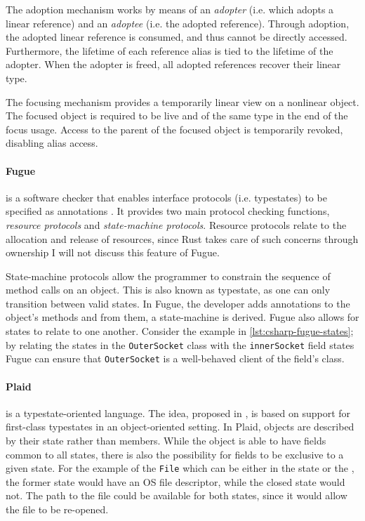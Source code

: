 The adoption mechanism works by means of an \emph{adopter} (i.e. which adopts a linear reference) and an \emph{adoptee} (i.e. the adopted reference).
Through adoption, the adopted linear reference is consumed, and thus cannot be directly accessed.
Furthermore, the lifetime of each reference alias is tied to the lifetime of the adopter.
When the adopter is freed, all adopted references recover their linear type.

The focusing mechanism provides a temporarily linear view on a nonlinear object.
The focused object is required to be live and of the same type in the end of the focus usage.
Access to the parent of the focused object is temporarily revoked, disabling alias access.

\paragraph{Fugue} is a software checker that enables interface protocols (i.e. typestates) to be specified as annotations \autocite{DeLine2004}.
It provides two main protocol checking functions, \emph{resource protocols} and \emph{state-machine protocols}.
Resource protocols relate to the allocation and release of resources,
since Rust takes care of such concerns through ownership I will not discuss this feature of Fugue.

State-machine protocols allow the programmer to constrain the sequence of method calls on an object.
This is also known as typestate, as one can only transition between valid states.
In Fugue, the developer adds annotations to the object's methods and from them, a state-machine is derived.
Fugue also allows for states to relate to one another.
Consider the example in \autoref{lst:csharp-fugue-states}; by relating the states in the \texttt{OuterSocket} class
with the \texttt{innerSocket} field states Fugue can ensure that \texttt{OuterSocket} is a well-behaved client of the field's class.



\paragraph{Plaid} is a typestate-oriented language.
The idea, proposed in \autocite{Aldrich2009}, is based on support for first-class typestates in an object-oriented setting.
In Plaid, objects are described by their state rather than members.
While the object is able to have fields common to all states, there is also the possibility for fields to be exclusive to a given state.
For the example of the \texttt{File} which can be either in the  state or the , the former state would have an OS file descriptor,
while the closed state would not. The path to the file could be available for both states, since it would allow the file to be re-opened.

